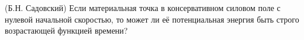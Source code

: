 (Б.Н. Садовский)
Если материальная точка в консервативном силовом поле с нулевой
начальной скоростью, то может ли её потенциальная энергия быть строго
возрастающей функцией времени?
